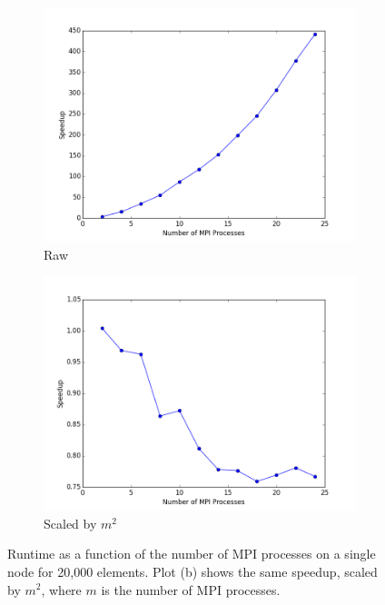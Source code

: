 \documentclass[10pt]{article}
\begin{document}
\begin{figure}[H]
        \centering
        \begin{subfigure}[b]{0.5\textwidth}
                \centering
                \includegraphics[width=\textwidth]{../figures/unscaled-mpi.png}
                \caption{Raw}
        \end{subfigure}%
                \begin{subfigure}[b]{0.5\textwidth}
                \centering
                \includegraphics[width=\textwidth]{../figures/scaled-mpi.png}
                \caption{Scaled by \(m^2\)}
        \end{subfigure}%
\caption{Runtime as a function of the number of MPI processes on a single node for 20,000 elements. Plot (b) shows the same speedup, scaled by \(m^2\), where \(m\) is the number of MPI processes.}
        \label{fig:speedupMPIruntime}
\end{figure}
\end{document}
